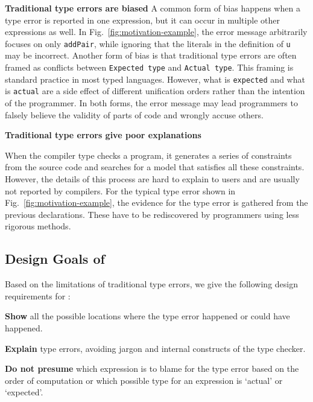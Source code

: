 \textbf{Traditional type errors are biased}
A common form of bias happens when a type error is reported in one expression, but it can occur in multiple other expressions as well. In Fig.~\ref{fig:motivation-example}, the error message arbitrarily focuses on only \texttt{addPair}, while ignoring that the literals in the definition of \texttt{u} may be incorrect. %
Another form of bias is that traditional type errors are often framed as conflicts between \texttt{Expected type} and \texttt{Actual type}. This framing is standard practice in most typed languages. However, what is \texttt{expected} and what is \texttt{actual} are a side effect of different unification orders rather than the intention of the programmer. In both forms, the error message may lead programmers to falsely believe the validity of parts of code and wrongly accuse others.

\textbf{Traditional type errors give poor explanations}

When the compiler type checks a program, it generates a series of constraints from the source code and searches for a model that satisfies all these constraints. However, the details of this process are hard to explain to users and are usually not reported by compilers. For the typical type error shown in Fig.~\ref{fig:motivation-example}, the evidence for the type error is gathered from the previous declarations. These have to be rediscovered by programmers using less rigorous methods. 

\subsection{Design Goals of \chameleon{}}
Based on the limitations of traditional type errors, we give the following design requirements for \chameleon{}:

\noindent\textbf{Show} all the possible locations where the type error happened or could have happened.

\noindent\textbf{Explain} type errors, avoiding jargon and internal constructs of the type checker.

\noindent\textbf{Do not presume} which expression is to blame for the type error based on the order of computation or which possible type for an expression is `actual' or `expected'.


